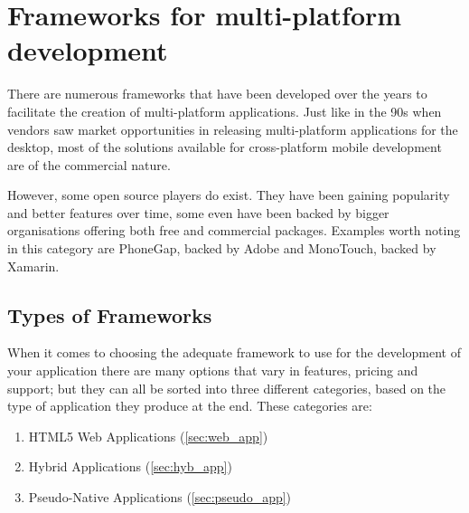 \chapter{Frameworks for multi-platform development}\label{ch:frameworks}
There are numerous frameworks that have been developed over the years to facilitate the creation of multi-platform applications. Just like in the 90s when vendors saw market opportunities in releasing multi-platform applications for the desktop, most of the solutions available for cross-platform mobile development are of the commercial nature.


However,  some open source players do exist. They have been gaining popularity and better features over time, some even have been backed by bigger organisations offering both free and commercial packages. Examples worth noting in this category are PhoneGap, backed by Adobe and MonoTouch, backed by Xamarin.

\section{Types of Frameworks}
When it comes to choosing the adequate framework to use for the development of your application there are many options that vary in features, pricing and support; but they can all be sorted into three different categories, based on the type of application they produce at the end. These categories are:
\begin{enumerate}
    \item HTML5 Web Applications (\autoref{sec:web_app})
    \item Hybrid Applications (\autoref{sec:hyb_app})
    \item Pseudo-Native Applications (\autoref{sec:pseudo_app})
\end{enumerate}

